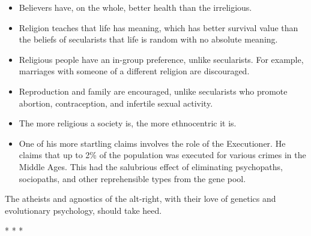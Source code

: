 \begin{itemize}
\item Believers have, on the whole, better health than the irreligious. 
\item Religion teaches that life has meaning, which has better survival value than the beliefs of secularists that life is random with no absolute meaning. 
\item Religious people have an in-group preference, unlike secularists. For example, marriages with someone of a different religion are discouraged. 
\item Reproduction and family are encouraged, unlike secularists who promote abortion, contraception, and infertile sexual activity. 
\item The more religious a society is, the more ethnocentric it is. 
\item One of his more startling claims involves the role of the Executioner. He claims that up to 2\% of the population was executed for various crimes in the Middle Ages. This had the salubrious effect of eliminating psychopaths, sociopaths, and other reprehensible types from the gene pool. 
\end{itemize}
The atheists and agnostics of the alt-right, with their love of genetics and evolutionary psychology, should take heed.




\begin{center}* * *\end{center}

